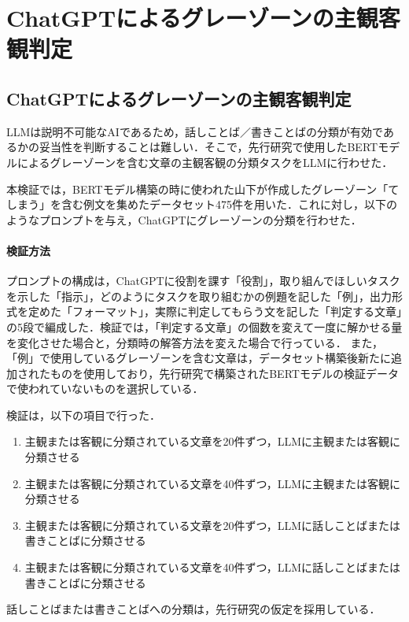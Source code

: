 \chapter{ChatGPTによるグレーゾーンの主観客観判定 \label{c6}}

\section{ChatGPTによるグレーゾーンの主観客観判定 \label{c6s2}}
LLMは説明不可能なAIであるため，話しことば／書きことばの分類が有効であるかの妥当性を判断することは難しい．そこで，先行研究で使用したBERTモデルによるグレーゾーンを含む文章の主観客観の分類タスクをLLMに行わせた．

本検証では，BERTモデル構築の時に使われた山下が作成したグレーゾーン「てしまう」を含む例文を集めたデータセット475件を用いた．これに対し，以下のようなプロンプトを与え，ChatGPTにグレーゾーンの分類を行わせた．



\subsubsection{検証方法}
プロンプトの構成は，ChatGPTに役割を課す「役割」，取り組んでほしいタスクを示した「指示」，どのようにタスクを取り組むかの例題を記した「例」，出力形式を定めた「フォーマット」，実際に判定してもらう文を記した「判定する文章」の5段で編成した．検証では，「判定する文章」の個数を変えて一度に解かせる量を変化させた場合と，分類時の解答方法を変えた場合で行っている．
また，「例」で使用しているグレーゾーンを含む文章は，データセット構築後新たに追加されたものを使用しており，先行研究\cite{ai-checker}で構築されたBERTモデルの検証データで使われていないものを選択している．


検証は，以下の項目で行った．
\begin{enumerate}
    \item 主観または客観に分類されている文章を20件ずつ，LLMに主観または客観に分類させる
    \item 主観または客観に分類されている文章を40件ずつ，LLMに主観または客観に分類させる
    \item 主観または客観に分類されている文章を20件ずつ，LLMに話しことばまたは書きことばに分類させる
    \item 主観または客観に分類されている文章を40件ずつ，LLMに話しことばまたは書きことばに分類させる
\end{enumerate}
話しことばまたは書きことばへの分類は，先行研究\cite{checker}の仮定を採用している．

